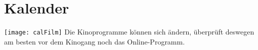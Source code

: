 
\chapter{Kalender}

\texttt{[image: calFilm]} %
Die Kinoprogramme können sich ändern, überprüft deswegen am besten vor dem Kinogang noch das Online-Programm.
